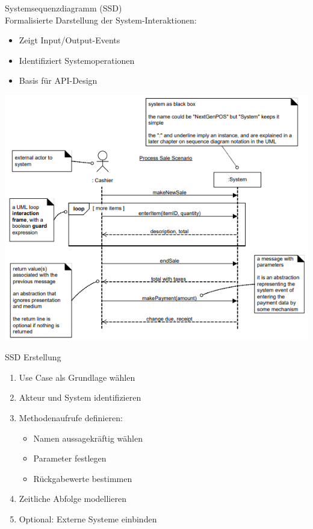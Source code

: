 \begin{definition}{Systemsequenzdiagramm (SSD)}\\
Formalisierte Darstellung der System-Interaktionen:
\begin{itemize}
    \item Zeigt Input/Output-Events
    \item Identifiziert Systemoperationen
    \item Basis für API-Design
\end{itemize}
\includegraphics[width=\linewidth]{images/ssd.png}
\end{definition}

\begin{KR}{SSD Erstellung}
\begin{enumerate}
    \item Use Case als Grundlage wählen
    \item Akteur und System identifizieren
    \item Methodenaufrufe definieren:
    \begin{itemize}
        \item Namen aussagekräftig wählen
        \item Parameter festlegen
        \item Rückgabewerte bestimmen
    \end{itemize}
    \item Zeitliche Abfolge modellieren
    \item Optional: Externe Systeme einbinden
\end{enumerate}
\end{KR}

